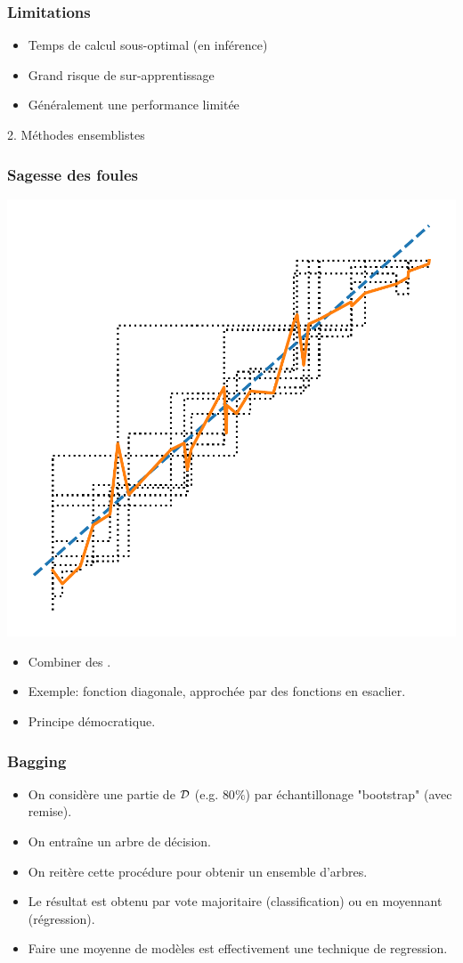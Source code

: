 \begin{frame}
  \frametitle{Limitations}
  \begin{itemize}
    \item Temps de calcul sous-optimal (en inférence)
    \item Grand risque de sur-apprentissage
    \item Généralement une performance limitée
  \end{itemize}
\end{frame}

\begin{frame}
  \begin{center}
    \large{2. Méthodes ensemblistes}
  \end{center}
\end{frame}

\begin{frame}
  \frametitle{Sagesse des foules}
  \begin{center}
    \includegraphics[width=.5\textwidth]{figures/crowd_diagonal}
  \end{center}
  \begin{itemize}
  \item Combiner des .
  \item Exemple: fonction diagonale, approchée par des fonctions en esaclier. 
  \item Principe démocratique. 
  \end{itemize}
\end{frame}

\begin{frame}
  \frametitle{Bagging}
  \begin{itemize}
    \item On considère une partie de $\mathcal{D}$ (e.g. $80\%$) par échantillonage "bootstrap" (avec remise). 
    \item On entraîne un arbre de décision. 
    \item On reitère cette procédure pour obtenir un ensemble d'arbres. 
    \item Le résultat est obtenu par vote majoritaire (classification) ou en moyennant (régression).  
    \item Faire une moyenne de modèles est effectivement une technique de regression. 
  \end{itemize}
\end{frame}

